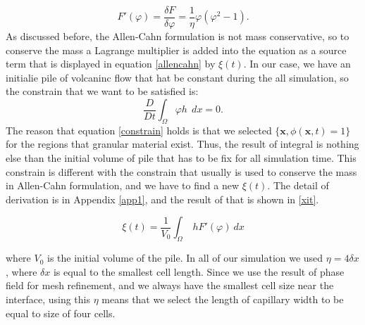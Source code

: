\documentclass[letterpaper,10pt]{article}
\begin{document}
\begin{equation} 
\label{fprime}
F'(\varphi)= \frac{\delta F}{\delta \varphi} = \frac{1}{\eta} \varphi (\varphi^2 -1).
\end{equation}
As discussed before, the Allen-Cahn formulation is not mass conservative, so to conserve the mass a Lagrange multiplier is added into 
the equation as a source term that is displayed in equation \eqref{allencahn} by $\xi(t)$. In our case, we have an initialie pile of volcaninc flow that hat be constant during the all simulation, so the constrain that we want to be satisfied is:
\begin{equation} 
\label{constrain}
\frac{D}{Dt} \int_\Omega \varphi h \ \ dx= 0.
\end{equation}
The reason that equation \eqref{constrain} holds is that we selected $ \lbrace \textbf{x}, \phi(\textbf{x},t)= 1 \rbrace  $ for the regions that granular material exist. Thus, the result of integral is nothing else than the initial volume of pile that has to be fix for all simulation time. This constrain is different with the constrain that usually is used to conserve the mass in Allen-Cahn formulation, and we have to find a new $\xi(t)$. The detail of derivation is in Appendix \ref{app1}, and the result of that is shown in \eqref{xit}.

\begin{equation} 
\label{xit}
\xi(t) = \frac{1}{V_0} \int_\Omega\  h F'(\varphi) \ dx
\end{equation}
 
where  $ V_0 $ is the initial volume of the pile.
In all of our simulation we used $\eta=4\delta x$, where $\delta x$ is equal to the smallest cell length. Since we use the result of phase field for mesh refinement, and we always have the smallest cell size near the interface, using this $\eta$ means that we select the length of capillary width to be equal to size of four cells.
% 
\end{document}
